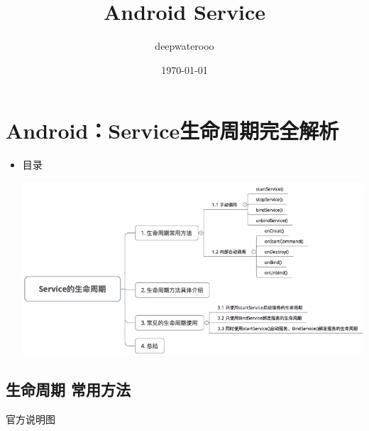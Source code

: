 \documentclass[9pt, b5paper]{article}
\author{deepwaterooo}
\date{\today}
\title{Android Service}
\begin{document}
\maketitle
\tableofcontents


\section{Android：Service生命周期完全解析}
\label{sec-1}
\begin{itemize}
\item 目录

\includegraphics[width=.9\linewidth]{./pic/serviceLifeCycle.png}
\end{itemize}
\subsection{生命周期 常用方法}
\label{sec-1-1}
官方说明图
\end{document}
